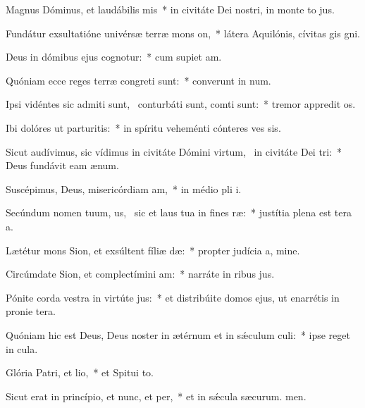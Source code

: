 \item Magnus Dóminus, et laudábilis mis~* in civitáte Dei nostri, in monte to jus.
\item Fundátur exsultatióne univérsæ terræ mons on,~* látera Aquilónis, cívitas gis gni.
\item Deus in dómibus ejus cognotur:~* cum supiet am.
\item Quóniam ecce reges terræ congreti sunt:~* converunt in num.
\item Ipsi vidéntes sic admiti sunt,~\pscross{} conturbáti sunt, comti sunt:~* tremor appredit os.
\item Ibi dolóres ut parturitis:~* in spíritu veheménti cónteres ves sis.
\item Sicut audívimus, sic vídimus in civitáte Dómini virtum,~\pscross{} in civitáte Dei tri:~* Deus fundávit eam  ænum.
\item Suscépimus, Deus, misericórdiam am,~* in médio pli i.
\item Secúndum nomen tuum, us,~\pscross{} sic et laus tua in fines ræ:~* justítia plena est tera a.
\item Lætétur mons Sion, et exsúltent fíliæ dæ:~* propter judícia a, mine.
\item Circúmdate Sion, et complectímini am:~* narráte in ribus jus.
\item Pónite corda vestra in virtúte jus:~* et distribúite domos ejus, ut enarrétis in pronie tera.
\item Quóniam hic est Deus, Deus noster in ætérnum et in sǽculum culi:~* ipse reget  in cula.
\item Glória Patri, et lio,~* et Spitui to.
\item Sicut erat in princípio, et nunc, et per,~* et in sǽcula sæcurum. men.
